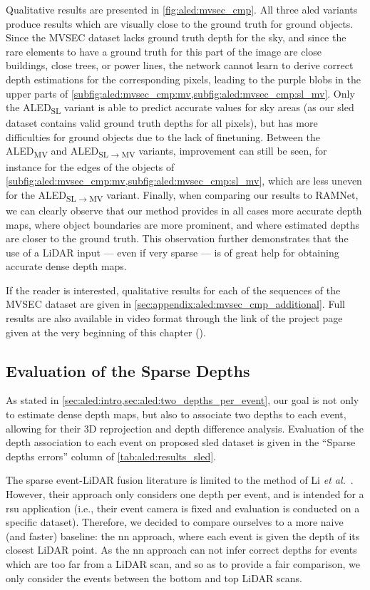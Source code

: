 Qualitative results are presented in \cref{fig:aled:mvsec_cmp}. All three \acrshort{aled} variants produce results which are visually close to the ground truth for ground objects. Since the MVSEC dataset lacks ground truth depth for the sky, and since the rare elements to have a ground truth for this part of the image are close buildings, close trees, or power lines, the network cannot learn to derive correct depth estimations for the corresponding pixels, leading to the purple blobs in the upper parts of \cref{subfig:aled:mvsec_cmp:mv,subfig:aled:mvsec_cmp:sl_mv}. Only the ALED\textsubscript{SL} variant is able to predict accurate values for sky areas (as our \acrshort{sled} dataset contains valid ground truth depths for all pixels), but has more difficulties for ground objects due to the lack of finetuning. Between the ALED\textsubscript{MV} and ALED\textsubscript{SL\(\rightarrow\)MV} variants, improvement can still be seen, for instance for the edges of the objects of \cref{subfig:aled:mvsec_cmp:mv,subfig:aled:mvsec_cmp:sl_mv}, which are less uneven for the ALED\textsubscript{SL\(\rightarrow\)MV} variant. Finally, when comparing our results to RAMNet, we can clearly observe that our method provides in all cases more accurate depth maps, where object boundaries are more prominent, and where estimated depths are closer to the ground truth. This observation further demonstrates that the use of a LiDAR input --- even if very sparse --- is of great help for obtaining accurate dense depth maps.

If the reader is interested, qualitative results for each of the sequences of the MVSEC dataset are given in \cref{sec:appendix:aled:mvsec_cmp_additional}. Full results are also available in video format through the link of the project page given at the very beginning of this chapter ().

\subsection{Evaluation of the Sparse Depths}\label{sec:aled:eval:sparse}
As stated in \cref{sec:aled:intro,sec:aled:two_depths_per_event}, our goal is not only to estimate dense depth maps, but also to associate two depths to each event, allowing for their 3D reprojection and depth difference analysis. Evaluation of the depth association to each event on proposed \acrshort{sled} dataset is given in the ``Sparse depths errors'' column of \cref{tab:aled:results_sled}.

The sparse event-LiDAR fusion literature is limited to the method of Li \textit{et al.}~\cite{Li2021Enhancing3L}. However, their approach only considers one depth per event, and is intended for a \acrfull{rsu} application (i.e., their event camera is fixed and evaluation is conducted on a specific dataset). Therefore, we decided to compare ourselves to a more naive (and faster) baseline: the \acrfull{nn} approach, where each event is given the depth of its closest LiDAR point. As the \acrlong{nn} approach can not infer correct depths for events which are too far from a LiDAR scan, and so as to provide a fair comparison, we only consider the events between the bottom and top LiDAR scans.

